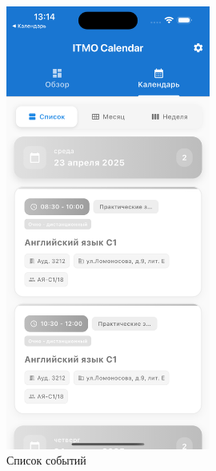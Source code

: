 \begin{figure}[h!]
    \centering
    \includegraphics[width=0.6\textwidth]{images/calendar-list.png}
    \caption{Список событий}
    \label{fig:calendar-list}
\end{figure}

